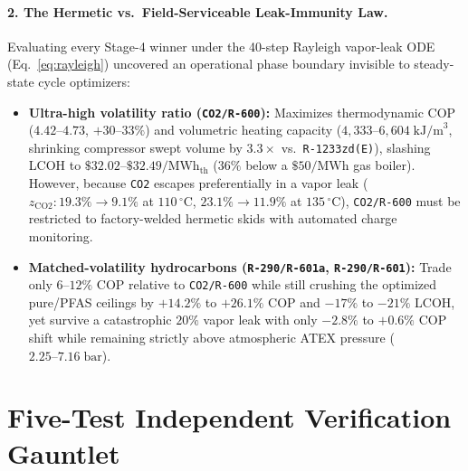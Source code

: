 \documentclass[twocolumn,10pt]{article}
\begin{document}
\paragraph{2. The Hermetic vs.\ Field-Serviceable Leak-Immunity Law.}
Evaluating every Stage-4 winner under the 40-step Rayleigh vapor-leak ODE (Eq.~\ref{eq:rayleigh}) uncovered an operational phase boundary invisible to steady-state cycle optimizers:
\begin{itemize}\setlength{\itemsep}{1pt}
  \item \textbf{Ultra-high volatility ratio (\texttt{CO2/R-600}):} Maximizes thermodynamic COP ($4.42\text{--}4.73$, $+30\text{--}33\%$) and volumetric heating capacity ($4{,}333\text{--}6{,}604\;\text{kJ/m}^3$, shrinking compressor swept volume by $3.3\times$ vs.\ \texttt{R-1233zd(E)}), slashing LCOH to $\$32.02\text{--}\$32.49/\text{MWh}_{\text{th}}$ ($36\%$ below a $\$50/\text{MWh}$ gas boiler). However, because \texttt{CO2} escapes preferentially in a vapor leak ($z_{\text{CO2}}: 19.3\%\to 9.1\%$ at $110\,^\circ\text{C}$, $23.1\%\to 11.9\%$ at $135\,^\circ\text{C}$), \texttt{CO2/R-600} must be restricted to factory-welded hermetic skids with automated charge monitoring.
  \item \textbf{Matched-volatility hydrocarbons (\texttt{R-290/R-601a}, \texttt{R-290/R-601}):} Trade only $6\text{--}12\%$ COP relative to \texttt{CO2/R-600} while still crushing the optimized pure/PFAS ceilings by $+14.2\%$ to $+26.1\%$ COP and $-17\%$ to $-21\%$ LCOH, yet survive a catastrophic $20\%$ vapor leak with only $-2.8\%$ to $+0.6\%$ COP shift while remaining strictly above atmospheric ATEX pressure ($2.25\text{--}7.16\;\text{bar}$).
\end{itemize}

\section{Five-Test Independent Verification Gauntlet}
\end{document}
